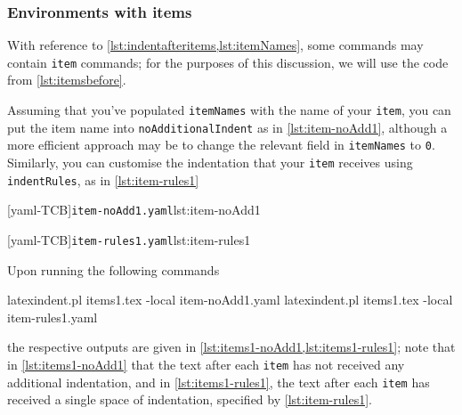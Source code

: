 \subsubsection{Environments with items}
	With reference to \vref{lst:indentafteritems,lst:itemNames}, some commands may contain \texttt{item} commands; for the purposes of this discussion, we will use the code from \vref{lst:itemsbefore}.

	Assuming that you've populated \texttt{itemNames} with the name of your \texttt{item}, you can put the item name into \texttt{noAdditionalIndent} as in \cref{lst:item-noAdd1}, although a more efficient approach may be to change the relevant field in \texttt{itemNames} to \texttt{0}.
	Similarly, you can customise the indentation that your \texttt{item} receives using \texttt{indentRules}, as in \cref{lst:item-rules1} 

	\begin{minipage}{.45\textwidth}
		[yaml-TCB]{\texttt{item-noAdd1.yaml}}{lst:item-noAdd1}
	\end{minipage} \hfill
	\begin{minipage}{.45\textwidth}
		[yaml-TCB]{\texttt{item-rules1.yaml}}{lst:item-rules1}
	\end{minipage} 

	Upon running the following commands \begin{commandshell}
latexindent.pl items1.tex -local item-noAdd1.yaml  
latexindent.pl items1.tex -local item-rules1.yaml  
\end{commandshell} the respective outputs are given in \cref{lst:items1-noAdd1,lst:items1-rules1}; note that in \cref{lst:items1-noAdd1} that the text after each \texttt{item} has not received any additional indentation, and in \cref{lst:items1-rules1}, the text after each \texttt{item} has received a single space of indentation, specified by \cref{lst:item-rules1}.

	\begin{minipage}{.45\textwidth}
	\end{minipage}
	\hfill
	\begin{minipage}{.45\textwidth}
	\end{minipage}

